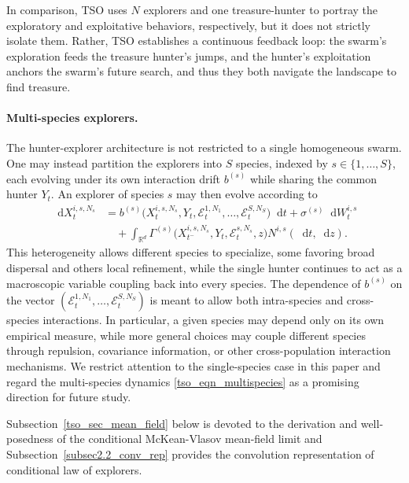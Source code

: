 \documentclass{article}
\newcommand*\der{\mathop{}\!\mathrm{d}}
\numberwithin{equation}{section}
\begin{document}
In comparison, TSO uses $N$ explorers and one treasure-hunter to portray the exploratory and exploitative behaviors, respectively, but it does not strictly isolate them. Rather, TSO establishes a continuous feedback loop: the swarm's exploration feeds the treasure hunter's jumps, and the hunter's exploitation anchors the swarm's future search, and thus they both navigate the landscape to find treasure.  



\paragraph{Multi-species explorers.} The hunter-explorer architecture is not restricted to a single homogeneous swarm. One may instead partition the explorers into $S$ species, indexed by $s \in \{1,\dots,S\}$, each evolving under its own interaction drift $b^{(s)}$ while sharing the common hunter $Y_t$. An explorer of species $s$ may then evolve according to
\begin{align}\label{tso_eqn_multispecies}
    \der X_t^{i,s,N_s}
    &=  b^{(s)}
    \bigl(X_t^{i,s,N_s},Y_t,\mathcal{E}_t^{1,N_1},\dots,\mathcal E_t^{S,N_S}\bigr)\der t + \sigma^{(s)}\der W_t^{i,s} \nonumber\\ &\quad + \int_{\mathbb R^d}
    \Gamma^{(s)}
    \bigl(X_{t^-}^{i,s,N_s},Y_t,\mathcal{E}_t^{s,N_s},z\bigr)
    N^{i,s}(\der t,\der z).
\end{align}
 This heterogeneity allows different species to specialize, some favoring broad dispersal and others local refinement, while the single hunter continues to act as a macroscopic variable coupling back into every species. The dependence of $b^{(s)}$ on the vector
$(\mathcal E_t^{1,N_1},\dots,\mathcal E_t^{S,N_S})$ is meant to allow both intra-species and cross-species interactions. In particular, a given species may depend only on its own empirical measure, while more general choices may couple different species through repulsion, covariance information, or other cross-population interaction mechanisms. We restrict attention to the single-species case in this paper and regard the multi-species dynamics \eqref{tso_eqn_multispecies} as a promising direction for future study.

Subsection~\ref{tso_sec_mean_field} below is devoted to the derivation and well-posedness of the conditional McKean-Vlasov mean-field limit and Subsection~\ref{subsec2.2_conv_rep} provides the convolution representation of conditional law of explorers. 
\end{document}

